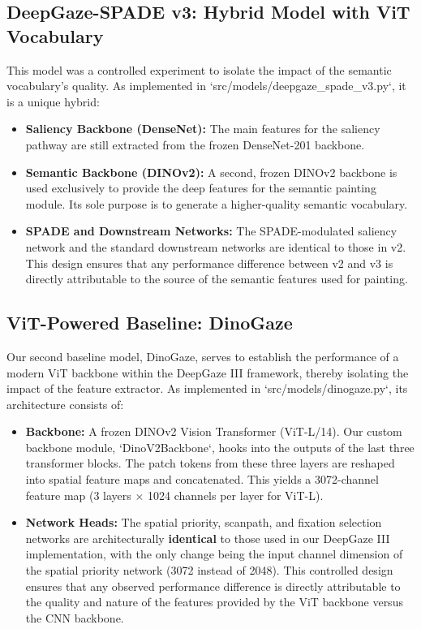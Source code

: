 \subsection{DeepGaze-SPADE v3: Hybrid Model with ViT Vocabulary}
This model was a controlled experiment to isolate the impact of the semantic vocabulary's quality. As implemented in `src/models/deepgaze\_spade\_v3.py`, it is a unique hybrid:

\begin{itemize}
    \item \textbf{Saliency Backbone (DenseNet):} The main features for the saliency pathway are still extracted from the frozen DenseNet-201 backbone.
    \item \textbf{Semantic Backbone (DINOv2):} A second, frozen DINOv2 backbone is used exclusively to provide the deep features for the semantic painting module. Its sole purpose is to generate a higher-quality semantic vocabulary.
    \item \textbf{SPADE and Downstream Networks:} The SPADE-modulated saliency network and the standard downstream networks are identical to those in v2. This design ensures that any performance difference between v2 and v3 is directly attributable to the source of the semantic features used for painting.
\end{itemize}


\subsection{ViT-Powered Baseline: DinoGaze}
Our second baseline model, DinoGaze, serves to establish the performance of a modern ViT backbone within the DeepGaze III framework, thereby isolating the impact of the feature extractor. As implemented in `src/models/dinogaze.py`, its architecture consists of:

\begin{itemize}
    \item \textbf{Backbone:} A frozen DINOv2 Vision Transformer (ViT-L/14). Our custom backbone module, `DinoV2Backbone`, hooks into the outputs of the last three transformer blocks. The patch tokens from these three layers are reshaped into spatial feature maps and concatenated. This yields a 3072-channel feature map (3 layers $\times$ 1024 channels per layer for ViT-L).
    \item \textbf{Network Heads:} The spatial priority, scanpath, and fixation selection networks are architecturally \textbf{identical} to those used in our DeepGaze III implementation, with the only change being the input channel dimension of the spatial priority network (3072 instead of 2048). This controlled design ensures that any observed performance difference is directly attributable to the quality and nature of the features provided by the ViT backbone versus the CNN backbone.
\end{itemize}

